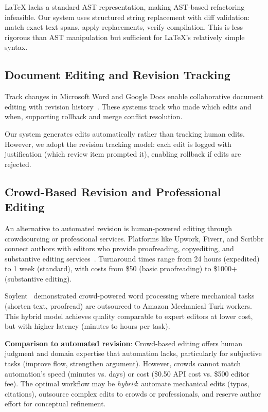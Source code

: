 LaTeX lacks a standard AST representation, making AST-based refactoring infeasible. Our system uses structured string replacement with diff validation: match exact text spans, apply replacements, verify compilation. This is less rigorous than AST manipulation but sufficient for LaTeX's relatively simple syntax.

\subsection{Document Editing and Revision Tracking}

Track changes in Microsoft Word and Google Docs enable collaborative document editing with revision history~\cite{sun1998operational}. These systems track who made which edits and when, supporting rollback and merge conflict resolution.

Our system generates edits automatically rather than tracking human edits. However, we adopt the revision tracking model: each edit is logged with justification (which review item prompted it), enabling rollback if edits are rejected.

\subsection{Crowd-Based Revision and Professional Editing}

An alternative to automated revision is human-powered editing through crowdsourcing or professional services. Platforms like Upwork, Fiverr, and Scribbr connect authors with editors who provide proofreading, copyediting, and substantive editing services~\cite{bernstein2010soylent}. Turnaround times range from 24 hours (expedited) to 1 week (standard), with costs from \$50 (basic proofreading) to \$1000+ (substantive editing).

Soylent~\cite{bernstein2010soylent} demonstrated crowd-powered word processing where mechanical tasks (shorten text, proofread) are outsourced to Amazon Mechanical Turk workers. This hybrid model achieves quality comparable to expert editors at lower cost, but with higher latency (minutes to hours per task).

\textbf{Comparison to automated revision}: Crowd-based editing offers human judgment and domain expertise that automation lacks, particularly for subjective tasks (improve flow, strengthen argument). However, crowds cannot match automation's speed (minutes vs. days) or cost (\$0.50 API cost vs. \$500 editor fee). The optimal workflow may be \textit{hybrid}: automate mechanical edits (typos, citations), outsource complex edits to crowds or professionals, and reserve author effort for conceptual refinement.

